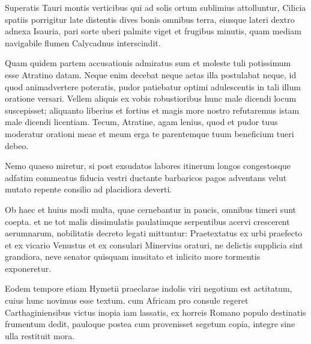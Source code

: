 Superatis Tauri montis verticibus qui ad solis ortum sublimius attolluntur, Cilicia spatiis porrigitur late distentis dives bonis omnibus 
terra, eiusque lateri dextro adnexa Isauria, pari sorte uberi palmite viget et frugibus minutis, quam mediam navigabile flumen 
Calycadnus interscindit.

Quam quidem partem accusationis admiratus sum et moleste tuli potissimum esse Atratino datam. Neque enim decebat neque 
aetas illa postulabat neque, id quod animadvertere poteratis, pudor patiebatur optimi adulescentis in tali illum oratione versari. 
Vellem aliquis ex vobis robustioribus hunc male dicendi locum suscepisset; aliquanto liberius et fortius et magis more nostro 
refutaremus istam male dicendi licentiam. Tecum, Atratine, agam lenius, quod et pudor tuus moderatur orationi meae et meum 
erga te parentemque tuum beneficium tueri debeo.

Nemo quaeso miretur, si post exsudatos labores itinerum longos congestosque adfatim commeatus fiducia vestri ductante 
barbaricos pagos adventans velut mutato repente consilio ad placidiora deverti.

Ob haec et huius modi multa, quae cernebantur in paucis, omnibus timeri sunt coepta. et ne tot malis dissimulatis paulatimque 
serpentibus acervi crescerent aerumnarum, nobilitatis decreto legati mittuntur: Praetextatus ex urbi praefecto et ex vicario 
Venustus et ex consulari Minervius oraturi, ne delictis supplicia sint grandiora, neve senator quisquam inusitato et inlicito more 
tormentis exponeretur.

Eodem tempore etiam Hymetii praeclarae indolis viri negotium est actitatum, cuius hunc novimus esse textum. cum Africam pro 
consule regeret Carthaginiensibus victus inopia iam lassatis, ex horreis Romano populo destinatis frumentum dedit, pauloque 
postea cum provenisset segetum copia, integre sine ulla restituit mora.
